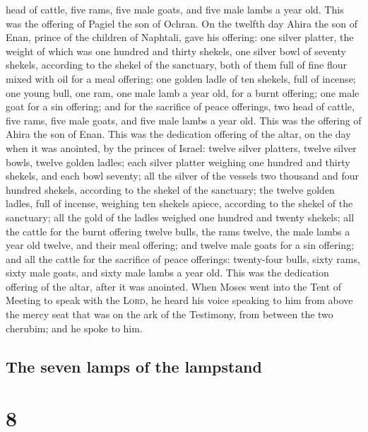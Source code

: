 head of cattle, five rams, five male goats, and five male lambs a year
old. This was the offering of Pagiel the son of Ochran. 
On the twelfth day Ahira the son of Enan, prince of the children of
Naphtali,  gave his offering: one silver platter, the
weight of which was one hundred and thirty shekels, one silver bowl of
seventy shekels, according to the shekel of the sanctuary, both of them
full of fine flour mixed with oil for a meal offering; 
one golden ladle of ten shekels, full of incense;  one
young bull, one ram, one male lamb a year old, for a burnt offering;
 one male goat for a sin offering;  and
for the sacrifice of peace offerings, two head of cattle, five rams,
five male goats, and five male lambs a year old. This was the offering
of Ahira the son of Enan.  This was the dedication
offering of the altar, on the day when it was anointed, by the princes
of Israel: twelve silver platters, twelve silver bowls, twelve golden
ladles;  each silver platter weighing one hundred and
thirty shekels, and each bowl seventy; all the silver of the vessels two
thousand and four hundred shekels, according to the shekel of the
sanctuary;  the twelve golden ladles, full of incense,
weighing ten shekels apiece, according to the shekel of the sanctuary;
all the gold of the ladles weighed one hundred and twenty shekels;
 all the cattle for the burnt offering twelve bulls, the
rams twelve, the male lambs a year old twelve, and their meal offering;
and twelve male goats for a sin offering;  and all the
cattle for the sacrifice of peace offerings: twenty-four bulls, sixty
rams, sixty male goats, and sixty male lambs a year old. This was the
dedication offering of the altar, after it was anointed. 
When Moses went into the Tent of Meeting to speak with the
\textsc{Lord}, he heard his voice speaking to him from above the mercy
seat that was on the ark of the Testimony, from between the two
cherubim; and he spoke to him.

\hypertarget{the-seven-lamps-of-the-lampstand}{%
\subsection{The seven lamps of the
lampstand}\label{the-seven-lamps-of-the-lampstand}}

\hypertarget{section-7}{%
\section{8}\label{section-7}}

